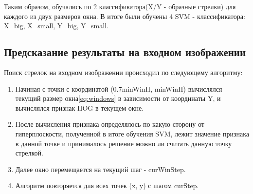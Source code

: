 Таким образом, обучались по 2 классификатора(X/Y - образные стрелки) для каждого из двух размеров окна. В итоге были обучены 4 SVM - классификатора: X\_big, X\_small, Y\_big, Y\_small.

\subsection{Предсказание результаты на входном изображении}
Поиск стрелок на входном изображении происходил по следующему алгоритму:



\begin{enumerate}
	\item Начиная с точки с координатой (0.7minWinH, minWinH) вычислялся текущий размер окна\ref{eq:windows} в зависимости от координаты Y, и вычислялся признак HOG в текущем окне. 
	\item После вычисления признака определялось по какую сторону от гиперплоскости, полученной в итоге обучения SVM, лежит значение признака в данной точке и принималось решение можно ли считать данную точку стрелкой.
	\item Далее окно перемещается на текущий шаг - curWinStep.
	\item Алгоритм повторяется для всех точек (x, y) с шагом curStep.
\end{enumerate}

